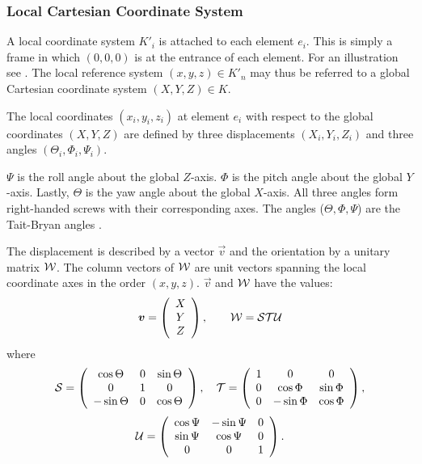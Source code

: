\subsubsection{Local Cartesian Coordinate System}
A local coordinate system $K'_i$ is attached to each element $e_i$. This is simply a frame in which $(0,0,0)$ is at the entrance of  each element. For an illustration see . The local reference system $(x, y, z) \in K'_n$
may thus be referred to a global Cartesian coordinate system $(X, Y, Z) \in K$.

The local coordinates $(x_i, y_i, z_i)$ at element $e_i$ with respect to the global coordinates $(X, Y, Z)$ are defined by three displacements $(X_i, Y_i, Z_i)$ and three angles $(\Theta_i, \Phi_i, \Psi_i)$.

$\Psi$ is the roll angle about the global $Z$-axis. $\Phi$ is the pitch angle about the global $Y$-axis. Lastly, $\Theta$ is the yaw angle about the global $X$-axis. All three angles form right-handed screws with their corresponding axes. The angles ($\Theta,\Phi,\Psi$) are the  Tait-Bryan angles \cite{bib:tait-bryan}.

The displacement is described by a vector $\vec{v}$
and the orientation by a unitary matrix $\mathcal{W}$.
The column vectors of $\mathcal{W}$ are unit vectors spanning
the local coordinate axes in the order $(x, y, z)$.
$\vec{v}$ and $\mathcal{W}$ have the values:
\begin{equation}
\vec{v} =\left(\begin{array}{c}
    X \\
    Y \\
    Z
  \end{array}\right),
\qquad
\matr{W}=\matr{S}\matr{T}\matr{U}
\end{equation}
where
\begin{equation}
\matr{S}=\left(\begin{array}{ccc}
    \cos\Theta &  0 &  \sin\Theta \\
    0         &  1 &   0 \\
    -\sin\Theta &  0 &  \cos\Theta
  \end{array}\right),
\quad
\matr{T}=\left(\begin{array}{ccc}
    1 &  0        &  0 \\
    0 &  \cos\Phi &  \sin\Phi \\
    0 & -\sin\Phi &  \cos\Phi
  \end{array}\right),
\end{equation}
\begin{equation}
\matr{U}=\left(\begin{array}{ccc}
    \cos\Psi & -\sin\Psi &  0 \\
    \sin\Psi &  \cos\Psi &  0 \\
    0        &  0        &  1
  \end{array}\right).
\end{equation}


